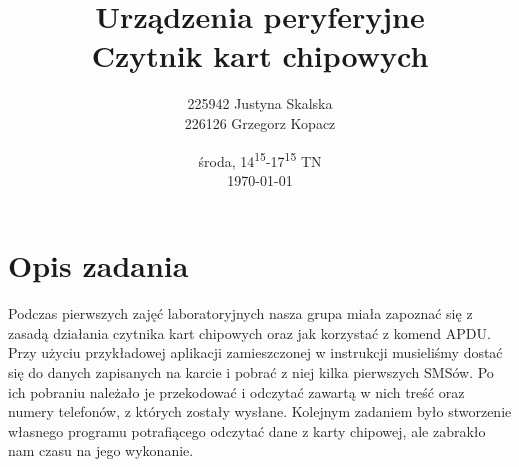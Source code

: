\documentclass{article}
\title{\textbf{\huge{Urządzenia peryferyjne}} \\
        Czytnik kart chipowych}
\author{225942 Justyna Skalska \\
        226126 Grzegorz Kopacz}
\date{środa, 14\textsuperscript{15}-17\textsuperscript{15} TN\\[10pt]
    \today}
\begin{document}
\maketitle
\section{Opis zadania}
Podczas pierwszych zajęć laboratoryjnych nasza grupa miała zapoznać się z zasadą działania czytnika kart chipowych oraz jak korzystać z komend APDU. Przy użyciu przykładowej aplikacji zamieszczonej w instrukcji musieliśmy dostać się do danych zapisanych na karcie i pobrać z niej kilka pierwszych SMSów. Po ich pobraniu należało je przekodować i odczytać zawartą w nich treść oraz numery telefonów, z których zostały wysłane. Kolejnym zadaniem było stworzenie własnego programu potrafiącego odczytać dane z karty chipowej, ale zabrakło nam czasu na jego wykonanie. 
\end{document}
